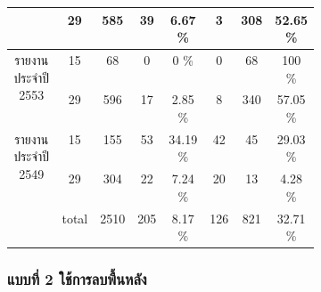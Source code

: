 \begin{table}[H]
\begin{tabular}{|c|c|c|p{0.1\linewidth}|p{0.1\linewidth}|c|p{0.1\linewidth}|p{0.1\linewidth}|}
                                            & 29    & 585       & \multicolumn{1}{c|}{39 }         & \multicolumn{1}{c|}{6.67 \% } & \multicolumn{1}{c|}{3  }    & \multicolumn{1}{c|}{308}             & \multicolumn{1}{c|}{52.65 \%} \\ \hline
        \multirow{2}{*}{รายงานประจำปี 2553}   & 15    & 68        & \multicolumn{1}{c|}{0  }         & \multicolumn{1}{c|}{0 \%    } & \multicolumn{1}{c|}{0  }    & \multicolumn{1}{c|}{68 }             & \multicolumn{1}{c|}{100 \%  }\\ \cline{2-8} 
                                            & 29    & 596       & \multicolumn{1}{c|}{17 }         & \multicolumn{1}{c|}{2.85 \% } & \multicolumn{1}{c|}{8  }    & \multicolumn{1}{c|}{340}             & \multicolumn{1}{c|}{57.05 \%} \\ \hline
        \multirow{2}{*}{รายงานประจำปี 2549}   & 15    & 155       & \multicolumn{1}{c|}{53 }         & \multicolumn{1}{c|}{34.19 \%}  &\multicolumn{1}{c|}{42}     &\multicolumn{1}{c|}{45}              &\multicolumn{1}{c|}{29.03 \%} \\ \cline{2-8} 
                                            & 29    & 304       & \multicolumn{1}{c|}{22 }         & \multicolumn{1}{c|}{7.24 \% } & \multicolumn{1}{c|}{20 }    & \multicolumn{1}{c|}{13 }             & \multicolumn{1}{c|}{4.28 \%}\\ \hline
        \multicolumn{1}{|l|}{}              & total & 2510      & \multicolumn{1}{c|}{205}         & \multicolumn{1}{c|}{8.17 \% } & \multicolumn{1}{c|}{126}    & \multicolumn{1}{c|}{821}             & \multicolumn{1}{c|}{32.71 \%} \\ \hline
        \end{tabular}
        \end{table}

\subsubsection{แบบที่ 2 ใช้การลบพื้นหลัง}

